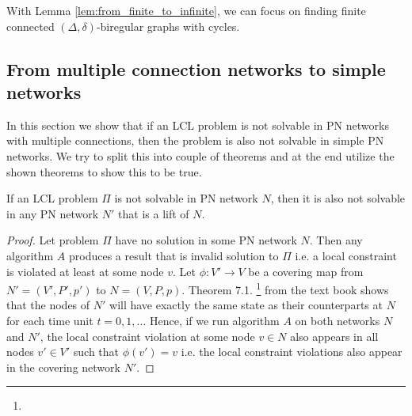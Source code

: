 With Lemma \ref{lem:from_finite_to_infinite}, we can focus on finding finite connected $(\Delta, \delta)$-biregular graphs with cycles.

\subsection{From multiple connection networks to simple networks} \label{sec:algorithm:from_multiple_to_simple}

In this section we show that if an LCL problem is not solvable in PN networks with multiple connections, then the problem is also not solvable in simple PN networks.
We try to split this into couple of theorems and at the end utilize the shown theorems to show this to be true.

\begin{lemma} \label{lem:lcl_unsolvability:2}
If an LCL problem $\Pi$ is not solvable in PN network $N$, then it is also not solvable in any PN network $N'$ that is a lift of $N$.
\end{lemma}
\begin{proof}
    Let problem $\Pi$ have no solution in some PN network $N$.
    Then any algorithm $A$ produces a result that is invalid solution to $\Pi$ i.e. a local constraint is violated at least at some node $v$.
    Let $\phi: V' \rightarrow V$ be a covering map from $N'=(V', P', p')$ to $N=(V, P, p)$.
    Theorem 7.1. \footnote{} from the text book \cite{HirvonenSuomelaDistAlg2020} shows that the nodes of $N'$ will have exactly the same state as their counterparts at $N$ for each time unit $t=0,1,...$
    Hence, if we run algorithm $A$ on both networks $N$ and $N'$, the local constraint violation at some node $v \in N$ also appears in all nodes $v' \in V'$ such that $\phi(v') = v$ i.e. the local constraint violations also appear in the covering network $N'$.
\end{proof}

